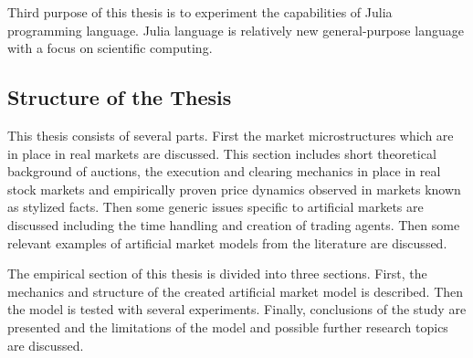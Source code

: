 Third purpose of this thesis is to experiment the capabilities of Julia programming language.
Julia language is relatively new general-purpose language with a focus on scientific computing.


\subsection{Structure of the Thesis}
This thesis consists of several parts. First the market microstructures which are in place in real 
markets are discussed. This section includes short theoretical background of auctions, the execution and clearing mechanics in place in real
stock markets and empirically proven price dynamics observed in markets known as stylized
facts. Then some generic issues specific to artificial markets are discussed including the time handling and creation
of trading agents. Then some relevant examples of artificial market models from the literature are discussed. 

The empirical section of this thesis is divided into three sections. First, the mechanics and
structure of the created artificial market model is described. Then the model is tested
with several experiments. Finally, conclusions of the study are presented and the limitations of the model and
possible further research topics are discussed.
